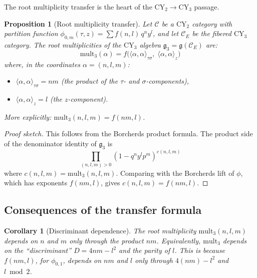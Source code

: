 \documentclass[11pt]{article}
\theoremstyle{plain}
\newtheorem{proposition}[theorem]{Proposition}
\newtheorem{corollary}[theorem]{Corollary}
\theoremstyle{definition}
\theoremstyle{remark}
\newcommand{\CY}{\mathrm{CY}}
\newcommand{\cC}{\mathcal{C}}
\begin{document}
The root multiplicity transfer is the heart of the $\CY_2 \to \CY_3$ passage.

\begin{proposition}[Root multiplicity transfer]
\label{prop:root-mult-transfer}
Let $\cC$ be a $\CY_2$ category with partition function
$\phi_{0,m}(\tau, z) = \sum f(n, l) \, q^n y^l$, and let $\cC_E$ be the
fibered $\CY_3$ category. The root multiplicities of the $\CY_3$ algebra
$\mathfrak{g}_3 = \mathfrak{g}(\cC_E)$ are:
\begin{equation}\label{eq:root-mult-transfer}
 \mathrm{mult}_3(\alpha) = f\bigl(\langle \alpha, \alpha \rangle_{\tau\sigma}, \;
 \langle \alpha, \alpha \rangle_z\bigr)
\end{equation}
where, in the coordinates $\alpha = (n, l, m)$:
\begin{itemize}
\item $\langle \alpha, \alpha \rangle_{\tau\sigma} = nm$ (the product of the
 $\tau$- and $\sigma$-components),
\item $\langle \alpha, \alpha \rangle_z = l$ (the $z$-component).
\end{itemize}
More explicitly: $\mathrm{mult}_3(n, l, m) = f(nm, l)$.
\end{proposition}

\begin{proof}[Proof sketch]
This follows from the Borcherds product formula. The product side of the
denominator identity of $\mathfrak{g}_3$ is
\[
 \prod_{(n,l,m) > 0} (1 - q^n y^l p^m)^{c(n,l,m)}
\]
where $c(n, l, m) = \mathrm{mult}_3(n, l, m)$. Comparing with the Borcherds
lift of $\phi$, which has exponents $f(nm, l)$, gives
$c(n, l, m) = f(nm, l)$.
\end{proof}

\subsection{Consequences of the transfer formula}
\label{subsec:transfer-consequences}

\begin{corollary}[Discriminant dependence]
\label{cor:discriminant-dependence}
The root multiplicity $\mathrm{mult}_3(n, l, m)$ depends on $n$ and $m$ only
through the product $nm$. Equivalently, $\mathrm{mult}_3$ depends on the
``discriminant'' $D = 4nm - l^2$ and the parity of $l$. This is because
$f(nm, l)$, for $\phi_{0,1}$, depends on $nm$ and $l$ only through
$4(nm) - l^2$ and $l \bmod 2$.
\end{corollary}
\end{document}
